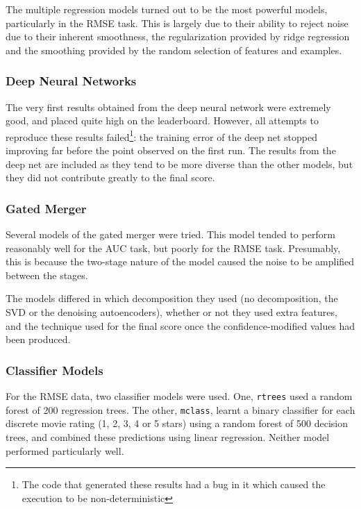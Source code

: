 \documentclass{article}
\begin{document}
The multiple regression models turned out to be the most powerful models, particularly in the RMSE task.  This is largely due to their ability to reject noise due to their inherent smoothness, the regularization provided by ridge regression and the smoothing provided by the random selection of features and examples.

\subsubsection{Deep Neural Networks}

The very first results obtained from the deep neural network were extremely good, and placed quite high on the leaderboard.  However, all attempts to reproduce these results failed\footnote{The code that generated these results had a bug in it which caused the execution to be non-deterministic}: the training error of the deep net stopped improving far before the point observed on the first run.  The results from the deep net are included as they tend to be more diverse than the other models, but they did not contribute greatly to the final score.

\subsubsection{Gated Merger}

Several models of the gated merger were tried.  This model tended to perform reasonably well for the AUC task, but poorly for the RMSE task.  Presumably, this is because the two-stage nature of the model caused the noise to be amplified between the stages.

The models differed in which decomposition they used (no decomposition, the SVD or the denoising autoencoders), whether or not they used extra features, and the technique used for the final score once the confidence-modified values had been produced.

\subsubsection{Classifier Models}

For the RMSE data, two classifier models were used.  One, \texttt{rtrees} used a random forest of 200 regression trees.  The other, \texttt{mclass}, learnt a binary classifier for each discrete movie rating (1, 2, 3, 4 or 5 stars) using a random forest of 500 decision trees, and combined these predictions using linear regression.  Neither model performed particularly well.
\end{document}
